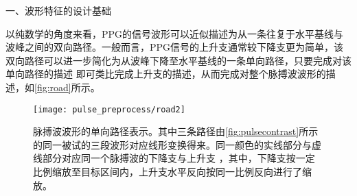 一、波形特征的设计基础

以纯数学的角度来看，PPG的信号波形可以近似描述为从一条往复于水平基线与波峰之间的双向路径。一般而言，PPG信号的上升支通常较下降支更为简单，该双向路径可以进一步简化为从波峰下降至水平基线的一条单向路径，只要完成对该单向路径的描述
即可类比完成上升支的描述，从而完成对整个脉搏波波形的描述，如\autoref{fig:road}所示。
\begin{figure}[htbp]
    \centering
    \texttt{[image: pulse\_preprocess/road2]}
    \caption[脉搏波波形的单向路径表示]{\label{fig:road}脉搏波波形的单向路径表示。其中三条路径由\autoref{fig:pulsecontrast}所示的同一被试的三段波形对应线形变换得来。同一颜色的实线部分与虚线部分对应同一个脉搏波的下降支与上升支
    ，其中，下降支按一定比例缩放至目标区间内，上升支水平反向按同一比例反向进行了缩放。}
\end{figure}

